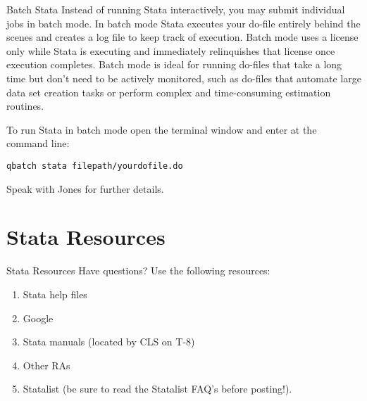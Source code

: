 \documentclass[fleqn, handout, 10pt]{beamer}
\begin{document}
\begin{frame}[fragile]{Batch Stata}
    Instead of running Stata interactively, you may submit individual jobs in batch mode. In batch mode Stata executes your do-file entirely behind the scenes and creates a log file to keep track of execution. Batch mode uses a license only while Stata is executing and immediately relinquishes that license once execution completes. Batch mode is ideal for running do-files that take a long time but don't need to be actively monitored, such as do-files that automate large data set creation tasks or perform complex and time-consuming estimation routines.

    To run Stata in batch mode open the terminal window and enter at the command line:
    \begin{lstlisting}
qbatch stata filepath/yourdofile.do
    \end{lstlisting}
    Speak with Jones for further details.
\end{frame}

\section{Stata Resources}

\begin{frame}{Stata Resources}
    Have questions? Use the following resources:
    \begin{enumerate}
        \item Stata help files
        \item Google
        \item Stata manuals (located by CLS on T-8)
        \item Other RAs
        \item Statalist (be sure to read the Statalist FAQ’s before posting!).
    \end{enumerate}
\end{frame}
\end{document}
